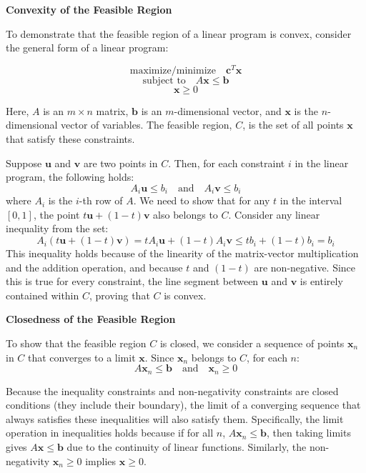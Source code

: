 \documentclass[8pt]{article}
\begin{document}
{\textbf{Convexity of the Feasible Region}

To demonstrate that the feasible region of a linear program is convex, consider the general form of a linear program:

\[
\text{maximize/minimize} \quad \mathbf{c}^T \mathbf{x}
\]
\[
\text{subject to} \quad A\mathbf{x} \leq \mathbf{b}
\]
\[
\mathbf{x} \geq 0
\]

Here, \( A \) is an \( m \times n \) matrix, \( \mathbf{b} \) is an \( m \)-dimensional vector, and \( \mathbf{x} \) is the \( n \)-dimensional vector of variables. The feasible region, \( C \), is the set of all points \( \mathbf{x} \) that satisfy these constraints.

Suppose \( \mathbf{u} \) and \( \mathbf{v} \) are two points in \( C \). Then, for each constraint \( i \) in the linear program, the following holds:
\[
A_i \mathbf{u} \leq b_i \quad \text{and} \quad A_i \mathbf{v} \leq b_i
\]
where \( A_i \) is the \( i \)-th row of \( A \). We need to show that for any \( t \) in the interval \([0, 1]\), the point \( t \mathbf{u} + (1 - t) \mathbf{v} \) also belongs to \( C \). Consider any linear inequality from the set:
\[
A_i (t \mathbf{u} + (1 - t) \mathbf{v}) = t A_i \mathbf{u} + (1 - t) A_i \mathbf{v} \leq t b_i + (1 - t) b_i = b_i
\]
This inequality holds because of the linearity of the matrix-vector multiplication and the addition operation, and because \( t \) and \( (1 - t) \) are non-negative. Since this is true for every constraint, the line segment between \( \mathbf{u} \) and \( \mathbf{v} \) is entirely contained within \( C \), proving that \( C \) is convex.

\textbf{Closedness of the Feasible Region}

To show that the feasible region \( C \) is closed, we consider a sequence of points \( \mathbf{x}_n \) in \( C \) that converges to a limit \( \mathbf{x} \). Since \( \mathbf{x}_n \) belongs to \( C \), for each \( n \):
\[
A \mathbf{x}_n \leq \mathbf{b} \quad \text{and} \quad \mathbf{x}_n \geq 0
\]

Because the inequality constraints and non-negativity constraints are closed conditions (they include their boundary), the limit of a converging sequence that always satisfies these inequalities will also satisfy them. Specifically, the limit operation in inequalities holds because if for all \( n \), \( A \mathbf{x}_n \leq \mathbf{b} \), then taking limits gives \( A \mathbf{x} \leq \mathbf{b} \) due to the continuity of linear functions. Similarly, the non-negativity \( \mathbf{x}_n \geq 0 \) implies \( \mathbf{x} \geq 0 \).

}
\end{document}

